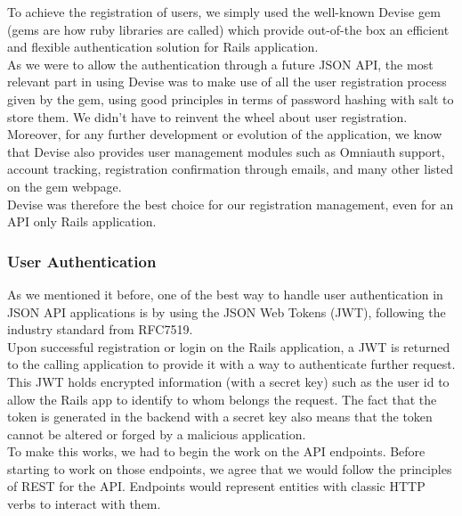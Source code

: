 \documentclass{eplmastersthesis}
\begin{document}
          To achieve the registration of users, we simply used the
          well-known Devise \cite{devise} gem (gems are how ruby libraries are
          called) which provide out-of-the box an efficient and flexible
          authentication solution for Rails application.\\
          As we were to allow the authentication through a future JSON API,
          the most relevant part in using Devise was to make use of all
          the user registration process given by the gem, using good principles
          in terms of password hashing with salt to store them. We didn't
          have to reinvent the wheel about user registration.\\

          Moreover, for any further development or evolution of the application,
          we know that Devise also provides user management modules such as
          Omniauth support, account tracking, registration confirmation
          through emails, and many other listed on the gem webpage.\\

          Devise was therefore the best choice for our registration management,
          even for an API only Rails application.

        \subsubsection{User Authentication}

          As we mentioned it before, one of the best way to handle user
          authentication in JSON API applications is by using the JSON Web
          Tokens (JWT), following the industry standard from RFC7519.\\

          Upon successful registration or login on the Rails application, a
          JWT is returned to the calling application to provide it with a way
          to authenticate further request. This JWT holds encrypted
          information (with a secret key) such as the user id to allow the Rails
          app to identify to whom belongs the request. The fact that the token
          is generated in the backend with a secret key also means that the
          token cannot be altered or forged by a malicious application.\\

          To make this works, we had to begin the work on the API endpoints.
          Before starting to work on those endpoints, we agree that we would
          follow the principles of REST \cite{rest} for the API. Endpoints would
          represent entities with classic HTTP verbs to interact with them.\\
\end{document}
